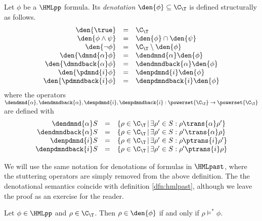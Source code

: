 \begin{definition}
    \label{dfn:hmlppsemantics}

    Let $\phi$ be a $\HMLpp$ formula. Its {\em denotation} $\den{\phi}\subseteq \C_\T$ 
    is defined structurally as follows.
    \[
    \begin{array}{r@{\quad}c@{\quad}l}
        \den{\true} &=&  \C_\T \\
        \den{\phi\land\psi} &=& \den{\phi} \cap \den{\psi} \\
        \den{\neg\phi} &=& \C_\T \setminus \den{\phi} \\
        \den{\dmnd{\alpha}\phi} &=& \dendmnd{\alpha}\den{\phi} \\
        \den{\dmndback{\alpha}\phi} &=& \dendmndback{\alpha}\den{\phi} \\
        \den{\pdmnd{i}\phi} &=& \denpdmnd{i}\den{\phi} \\
        \den{\pdmndback{i}\phi} &=& \denpdmndback{i}\den{\phi} \\
    \end{array}
    \]
    where the operators $\dendmnd{\alpha}, \dendmndback{\alpha},
    \denpdmnd{i}, \denpdmndback{i} : \powerset{\C_\T} \rightarrow \powerset{\C_\T}$
    are defined with
    \[
    \begin{array}{r@{\quad}c@{\quad}l}
        \dendmnd{\alpha}S &=& \{ \rho \in \C_\T \,|\, \exists \rho'\in S : \rho \trans{\alpha} \rho' \} \\
        \dendmndback{\alpha}S &=& \{ \rho \in \C_\T \,|\, \exists \rho'\in S : \rho' \trans{\alpha} \rho \} \\
        \denpdmnd{i}S &=& \{ \rho \in \C_\T \,|\, \exists \rho'\in S : \rho \ptrans{i} \rho' \} \\
        \denpdmndback{i}S &=& \{ \rho \in \C_\T \,|\, \exists \rho'\in S : \rho' \ptrans{i} \rho \} \\
    \end{array}
    \]
\end{definition}

We will use the same notation for denotations of formulas in $\HMLpast$, where
the stuttering operators are simply removed from the above definition.
The the denotational semantics coincide with definition \ref{dfn:hmlpast},
although we leave the proof as an exercise for the reader.

\begin{lemma}
    Let $\phi \in \HMLpp$ and $\rho \in \C_\T$. Then $\rho\in\den{\phi}$ if
    and only if $\rho \vDash^* \phi$.
\end{lemma}

